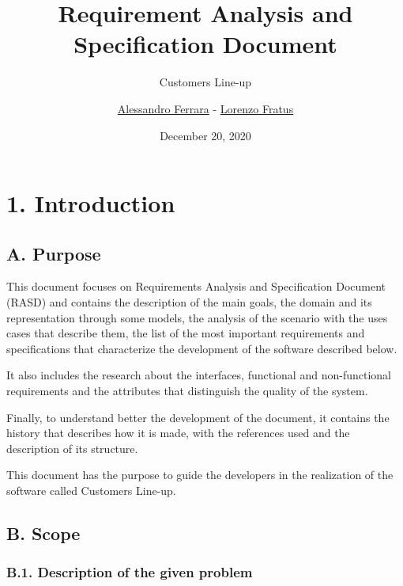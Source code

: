 
\usepackage{clipboard}
\usepackage{listings}
\usepackage{assets/rasd/alloy/alloy-style}
\graphicspath{ {assets/rasd/} }

\title{Requirement Analysis and\\Specification Document}
\subtitle{Customers Line-up}
\author{\href{https://github.com/ferrohd}{Alessandro Ferrara} -
\href{https://github.com/lorenzofratus}{Lorenzo Fratus}}
\date{December 20, 2020}



\maketitle

\tableofcontents

\chapter{1. Introduction}

\section{A. Purpose}

This document focuses on Requirements Analysis and Specification
Document (RASD) and contains the description of the main goals, the domain and its representation through some models, the analysis of the scenario with the uses cases that describe them, the list of the most important requirements and specifications that characterize the development of the software described below.

It also includes the research about the interfaces, functional and non-functional requirements and the attributes that distinguish the quality of the system.

Finally, to understand better the development of the document, it contains the history that describes how it is made, with the references used and the description of its structure.

This document has the purpose to guide the developers in the realization of the software called Customers Line-up.

\section{B. Scope}

\subsection{B.1. Description of the given problem}

